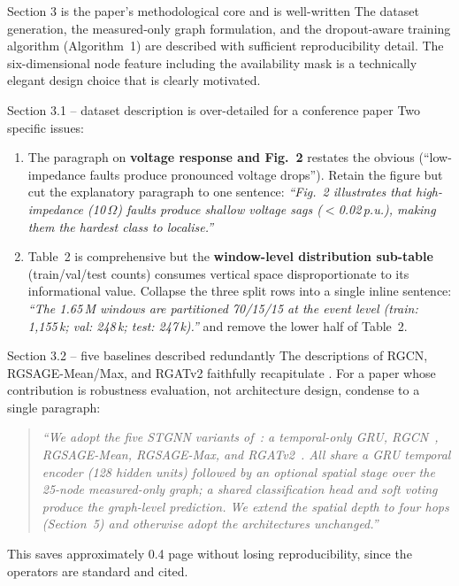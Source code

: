 \documentclass[11pt,a4paper]{article}
\begin{document}
\begin{okbox}{Section 3 is the paper's methodological core and is well-written}
The dataset generation, the measured-only graph formulation, and the dropout-aware
training algorithm (Algorithm~1) are described with sufficient reproducibility
detail. The six-dimensional node feature including the availability mask is a
technically elegant design choice that is clearly motivated.
\end{okbox}

\begin{warnbox}{Section 3.1 -- dataset description is over-detailed for a conference paper}
Two specific issues:
\begin{enumerate}[leftmargin=*,label=\arabic*.]
  \item The paragraph on \textbf{voltage response and Fig.~2} restates the
    obvious (``low-impedance faults produce pronounced voltage drops'').
    Retain the figure but cut the explanatory paragraph to one sentence:
    \textit{``Fig.~2 illustrates that high-impedance (10\,$\Omega$) faults
    produce shallow voltage sags ($<$0.02\,p.u.), making them the hardest
    class to localise.''}
  \item Table~2 is comprehensive but the \textbf{window-level distribution
    sub-table} (train/val/test counts) consumes vertical space disproportionate
    to its informational value. Collapse the three split rows into a single
    inline sentence:
    \textit{``The 1.65\,M windows are partitioned 70/15/15 at the event
    level (train: 1,155\,k; val: 248\,k; test: 247\,k).''}
    and remove the lower half of Table~2.
\end{enumerate}
\end{warnbox}

\begin{warnbox}{Section 3.2 -- five baselines described redundantly}
The descriptions of RGCN, RGSAGE-Mean/Max, and RGATv2 faithfully recapitulate
\cite{Karabulut2026}. For a paper whose contribution is robustness evaluation,
not architecture design, condense to a single paragraph:
\begin{quote}
\textit{``We adopt the five STGNN variants of~\cite{Karabulut2026}: a temporal-only
GRU, RGCN~\cite{Hamilton2017}, RGSAGE-Mean, RGSAGE-Max, and
RGATv2~\cite{Brody2022}. All share a GRU temporal encoder (128 hidden units)
followed by an optional spatial stage over the 25-node measured-only graph; a
shared classification head and soft voting produce the graph-level prediction.
We extend the spatial depth to four hops (Section~5) and otherwise adopt the
architectures unchanged.''}
\end{quote}
This saves approximately 0.4 page without losing reproducibility, since the
operators are standard and cited.
\end{warnbox}
\end{document}
